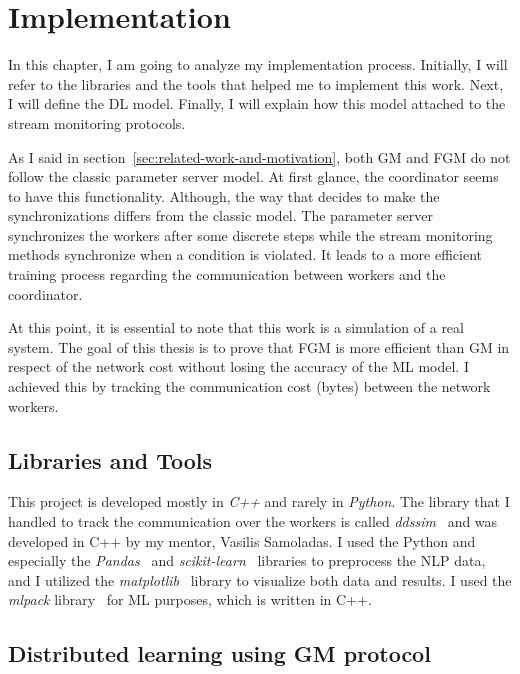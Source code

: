 \chapter{Implementation}\label{ch:implementation}

In this chapter, I am going to analyze my implementation process.
Initially, I will refer to the libraries and the tools that helped me to implement this work.
Next, I will define the DL model.
Finally, I will explain how this model attached to the stream monitoring protocols.

As I said in section~\ref{sec:related-work-and-motivation}, both GM and FGM do not follow the classic parameter server model.
At first glance, the coordinator seems to have this functionality.
Although, the way that decides to make the synchronizations differs from the classic model.
The parameter server synchronizes the workers after some discrete steps while the stream monitoring methods synchronize when a condition is violated.
It leads to a more efficient training process regarding the communication between workers and the coordinator.

At this point, it is essential to note that this work is a simulation of a real system.
The goal of this thesis is to prove that FGM is more efficient than GM in respect of the network cost without losing the accuracy of the ML model.
I achieved this by tracking the communication cost (bytes) between the network workers.


\section{Libraries and Tools}\label{sec:libraries-and-tools}

This project is developed mostly in \emph{C++} and rarely in \emph{Python}.
The library that I handled to track the communication over the workers
is called \emph{ddssim}~\cite{ddssim_repo} and was developed in C++ by my mentor, Vasilis Samoladas.
I used the Python and especially the \emph{Pandas}~\cite{pandas} and \emph{scikit-learn}~\cite{sklearn} libraries to preprocess the NLP data,
and I utilized the \emph{matplotlib}~\cite{matplotlib} library to visualize both data and results.
I used the \emph{mlpack} library~\cite{mlpack2018} for ML purposes, which is written in C++.


\section{Distributed learning using GM protocol}\label{sec:distributed-learning-using-gm-protocol}

